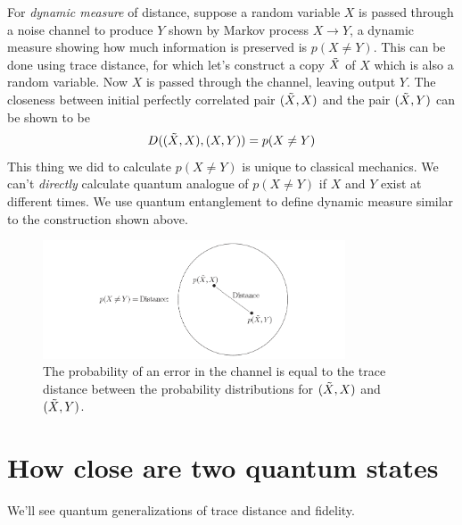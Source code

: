 For \textit{dynamic measure} of distance, suppose a random variable $X$ is passed through a noise channel to produce $Y$ shown by Markov process $X\longrightarrow Y$, a dynamic measure showing how much information is preserved is $p(X\neq Y)$. This can be done using trace distance, for which let's construct a copy $\Tilde{X}$ of $X$ which is also a random variable. Now $X$ is passed through the channel, leaving output $Y$. The closeness between initial perfectly correlated pair $(\Tilde{X}, X)$ and the pair $(\Tilde{X}, Y)$ can be shown to be
\begin{equation}
    D((\Tilde{X},X), (X, Y)) = p(X\neq Y)
\end{equation}
This thing we did to calculate $p(X\neq Y)$ is unique to classical mechanics. We can't \textit{directly} calculate quantum analogue of $p(X\neq Y)$ if $X$ and $Y$ exist at different times. We use quantum entanglement to define dynamic measure similar to the construction shown above. 
\begin{figure}[H]
    \centering
    \includegraphics[width=0.8\textwidth]{images/dynamic_measure.png}
    \caption{The probability of an error in the channel is equal to the trace distance between the probability distributions for $( \Tilde{X}, X)$ and $( \Tilde{X}, Y )$.}
    \label{fig:dynamic_measure}
\end{figure}

\section{How close are two quantum states}
We'll see quantum generalizations of trace distance and fidelity.
